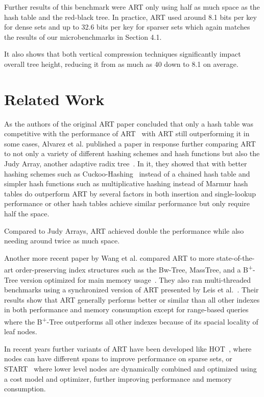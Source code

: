 \documentclass[acmtog, nonacm]{acmart}
\begin{document}
Further results of this benchmark were ART only using half as much space as the hash table and the red-black tree. 
In practice, ART used around 8.1 bits per key for dense sets and up to 32.6 bits per key for sparser sets which 
again matches the results of our microbenchmarks in Section 4.1.

It also shows that both vertical compression techniques significantly impact overall tree height, 
reducing it from as much as 40 down to 8.1 on average.

\section{Related Work}
As the authors of the original ART paper concluded that only a hash table was competitive with the performance of ART~\cite{6544812} 
with ART still outperforming it in some cases, Alvarez et al. published a paper in response further comparing ART to
not only a variety of different hashing schemes and hash functions but also the Judy Array, another adaptive radix tree~\cite{7113370}.
In it, they showed that with better hashing schemes such as Cuckoo-Hashing~\cite{PAGH2004122} instead of a chained hash table
and simpler hash functions such as multiplicative hashing instead of Marmur hash tables do outperform ART by several factors in
both insertion and single-lookup performance or other hash tables achieve similar performance but only require half the space.

Compared to Judy Arrays, ART achieved double the performance while also needing around twice as much space.

Another more recent paper by Wang et al. compared ART to more state-of-the-art order-preserving index structures such 
as the Bw-Tree, MassTree, and a B\textsuperscript{+}-Tree version optimized for main memory usage~\cite{10.1145/3183713.3196895}. They also ran multi-threaded
benchmarks using a synchronized version of ART presented by Leis et al.~\cite{10.1145/2933349.2933352}. Their results show
that ART generally performs better or similar than all other indexes in both performance and memory consumption except for
range-based queries where the B\textsuperscript{+}-Tree outperforms all other indexes because of its spacial locality of 
leaf nodes.

In recent years further variants of ART have been developed like HOT~\cite{10.1145/3183713.3196896}, where nodes can have different spans to improve performance
on sparse sets, or START~\cite{9094133} where lower level nodes are dynamically combined and optimized using
a cost model and optimizer, further improving performance and memory consumption.
\end{document}
